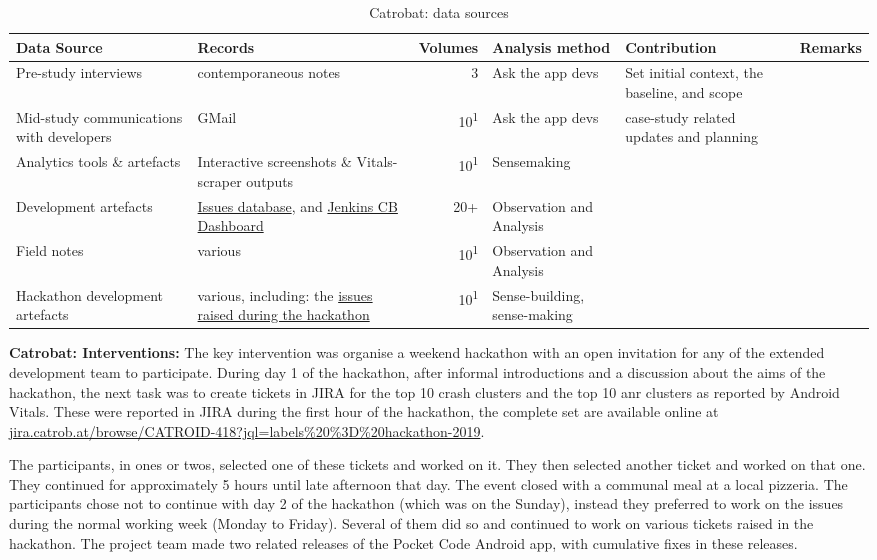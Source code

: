 \begin{table*}
    \centering
    \footnotesize
    \tabcolsep=0.12cm
    \begin{tabular}{p{2.4cm}p{2.4cm}r>{\raggedright}p{2.4cm}>{\raggedright}p{3cm}>{\raggedright\arraybackslash}p{2.5cm}}
        Data Source & Records & Volumes & Analysis method & Contribution & Remarks \\
        \toprule
         Pre-study interviews & contemporaneous notes & 3 & Ask the app devs & Set initial context, the baseline, and scope &  \\
         Mid-study communications with developers & GMail & 10\textsuperscript{1} & Ask the app devs & case-study related updates and planning &  \\
         Analytics tools \& artefacts & Interactive screenshots \& Vitals-scraper outputs &10\textsuperscript{1} & Sensemaking &  &  \\
         Development artefacts & \href{https://jira.catrob.at/}{Issues database}, and \href{https://jenkins.catrob.at/}{Jenkins CB Dashboard} & 20+ & Observation and Analysis & & \\
         Field notes & various & 10\textsuperscript{1} & Observation and Analysis & & \\
         Hackathon development artefacts & various, including: the \href{https://jira.catrob.at/browse/CATROID-418?jql=labels\%20\%3D\%20hackathon-2019}{issues raised during the hackathon} & 10\textsuperscript{1} & Sense-building, sense-making & & \\
         \bottomrule
    \end{tabular}
    \caption{Catrobat: data sources}
    \label{tab:catrobat-data-sources}
\end{table*}

\textbf{Catrobat: Interventions:} 
The key intervention was organise a weekend hackathon with an open invitation for any of the extended development team to participate.
%
During day 1 of the hackathon, after informal introductions and a discussion about the aims of the hackathon, the next task was to create tickets in JIRA for the top 10 crash clusters and the top 10 \acrshort{anr} clusters as reported by Android Vitals. These were reported in JIRA during the first hour of the hackathon, the complete set are available online at \href{https://jira.catrob.at/browse/CATROID-418?jql=labels\%20\%3D\%20hackathon-2019}{jira.catrob.at/browse/CATROID-418?jql=labels\%20\%3D\%20hackathon-2019}. 

The participants, in ones or twos, selected one of these tickets and worked on it. They then selected another ticket and worked on that one. They continued for approximately 5 hours until late afternoon that day. The event closed with a communal meal at a local pizzeria. The participants chose not to continue with day 2 of the hackathon (which was on the Sunday), instead they preferred to work on the issues during the normal working week (Monday to Friday). Several of them did so and continued to work on various tickets raised in the hackathon. The project team made two related releases of the Pocket Code Android app, with cumulative fixes in these releases.



